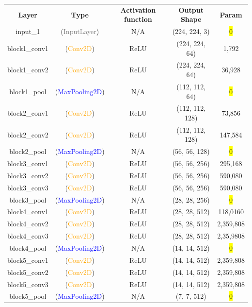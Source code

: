 \begin{frame}
\begin{center}
{\fontsize{8.5}{0}\selectfont
\begin{tabular}{ccccc}
\textbf{Layer} & \textbf{Type} & \textbf{Activation function} & \textbf{Output Shape} & \textbf{Param} \\
input\_1  & (\textcolor{gray}{InputLayer}) & N/A & (224, 224, 3) & \colorbox{yellow}{0} \\         
block1\_conv1 & (\textcolor{orange}{Conv2D}) & ReLU & (224, 224, 64) & 1,792 \\      
block1\_conv2 & (\textcolor{orange}{Conv2D}) & ReLU & (224, 224, 64) & 36,928 \\     
block1\_pool & (\textcolor{blue}{MaxPooling2D}) & N/A & (112, 112, 64) & \colorbox{yellow}{0} \\         
block2\_conv1 & (\textcolor{orange}{Conv2D}) & ReLU & (112, 112, 128) & 73,856 \\     
block2\_conv2 & (\textcolor{orange}{Conv2D}) & ReLU & (112, 112, 128) & 147,584 \\    
block2\_pool & (\textcolor{blue}{MaxPooling2D}) & N/A & (56, 56, 128) & \colorbox{yellow}{0} \\         
block3\_conv1 & (\textcolor{orange}{Conv2D}) & ReLU & (56, 56, 256) & 295,168 \\    
block3\_conv2 & (\textcolor{orange}{Conv2D}) & ReLU & (56, 56, 256) & 590,080 \\    
block3\_conv3 & (\textcolor{orange}{Conv2D}) & ReLU & (56, 56, 256) & 590,080 \\    
block3\_pool & (\textcolor{blue}{MaxPooling2D}) & N/A & (28, 28, 256) & \colorbox{yellow}{0} \\         
block4\_conv1 & (\textcolor{orange}{Conv2D}) & ReLU & (28, 28, 512) & 118,0160 \\   
block4\_conv2 & (\textcolor{orange}{Conv2D}) & ReLU & (28, 28, 512) & 2,359,808 \\   
block4\_conv3 & (\textcolor{orange}{Conv2D}) & ReLU & (28, 28, 512) & 2,35,9808 \\   
block4\_pool & (\textcolor{blue}{MaxPooling2D}) & N/A & (14, 14, 512) & \colorbox{yellow}{0} \\         
block5\_conv1 & (\textcolor{orange}{Conv2D}) & ReLU & (14, 14, 512) & 2,359,808 \\   
block5\_conv2 & (\textcolor{orange}{Conv2D}) & ReLU & (14, 14, 512) & 2,359,808 \\   
block5\_conv3 & (\textcolor{orange}{Conv2D}) & ReLU & (14, 14, 512) & 2,359,808 \\   
block5\_pool & (\textcolor{blue}{MaxPooling2D}) & N/A & (7, 7, 512) & \colorbox{yellow}{0} \\         

\end{tabular}}
\end{center}
\end{frame}
